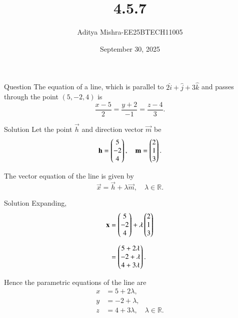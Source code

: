 \documentclass{beamer}
\title{4.5.7}
\author{Aditya Mishra-EE25BTECH11005}
\date{September 30, 2025}
\begin{document}
\begin{frame}
\titlepage
\end{frame}

\begin{frame}{Question}
The equation of a line, which is parallel to $2\hat{i} + \hat{j} + 3\hat{k}$ and passes through the point $(5, -2, 4)$ is
\[
\frac{x - 5}{2} = \frac{y + 2}{-1} = \frac{z - 4}{3}.
\]
\end{frame}

\begin{frame}{Solution}
Let the point $\vec{h}$ and direction vector $\vec{m}$ be  
\[
\mathbf{h} = \begin{pmatrix}5 \\ -2 \\ 4\end{pmatrix}, \quad 
\mathbf{m} = \begin{pmatrix}2 \\ 1 \\ 3\end{pmatrix}.
\]

The vector equation of the line is given by
\[
\vec{x} = \vec{h} + \lambda \vec{m}, \quad \lambda \in \mathbb{R}.
\]
\end{frame}

\begin{frame}{Solution}
Expanding,  
\begin{align}
\mathbf{x} &= \begin{pmatrix}5 \\ -2 \\ 4\end{pmatrix} + \lambda \begin{pmatrix}2 \\ 1 \\ 3\end{pmatrix} \\[2mm]
           &= \begin{pmatrix}5 + 2\lambda \\ -2 + \lambda \\ 4 + 3 \lambda\end{pmatrix}.
\end{align}

Hence the parametric equations of the line are  
\begin{align}
x &= 5 + 2\lambda, \\
y &= -2 + \lambda, \\
z &= 4 + 3\lambda, \quad \lambda \in \mathbb{R}.
\end{align}
\end{frame}
\end{document}
